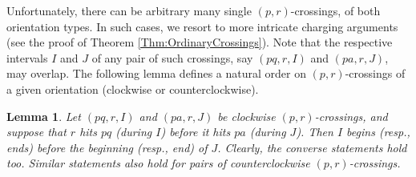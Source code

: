 \documentclass[letter,11pt]{article}
\newtheorem{lemma}[theorem]{Lemma}
\begin{document}
Unfortunately, there can be arbitrary many single $(p,r)$-crossings, of both orientation types. In such cases, we resort to more intricate charging arguments (see the proof of Theorem \ref{Thm:OrdinaryCrossings}). Note that the respective intervals $I$ and $J$ of any pair of such crossings, say $(pq,r,I)$ and $(pa,r,J)$, may overlap.
The following lemma defines a natural order on $(p,r)$-crossings of a given orientation (clockwise or counterclockwise).



\begin{lemma}\label{Lemma: OrderOrdinaryCrossings}
Let $(pq,r,I)$ and $(pa,r,J)$ be clockwise $(p,r)$-crossings, and suppose that $r$ hits $pq$ (during $I$) before it hits $pa$ (during $J$). Then $I$ begins (resp., ends) before the beginning (resp., end) of $J$. Clearly, the converse statements hold too. Similar statements also hold for pairs of counterclockwise $(p,r)$-crossings.
\end{lemma}
\end{document}
